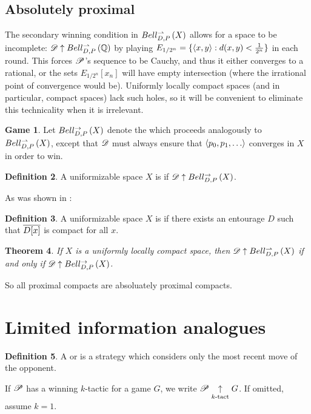 \documentclass{amsart}
\newtheorem{theorem}{Theorem}[section]
\theoremstyle{definition}
\newtheorem{definition}[theorem]{Definition}
\newtheorem{game}[theorem]{Game}
\begin{document}
\subsection{Absolutely proximal}

  The secondary winning condition in \(Bell_{D,P}^{\rightharpoonup}\left({X}\right)\)
  allows for a space to be incomplete: \(\mathscr{D}\uparrow Bell_{D,P}^{\rightharpoonup}\left({\mathbb{Q}}\right)\) by
  playing \(E_{1/2^n}=\{\langle x,y\rangle:d(x,y)<\frac{1}{2^n}\}\) in each round. This
  forces \(\mathscr{P}\)'s sequence to be Cauchy, and thus it either converges to
  a rational, or the sets \(E_{1/2^n}[x_n]\) will have empty intersection
  (where the irrational point of convergence would be). Uniformly locally
  compact spaces (and in particular, compact spaces) lack such holes, so it
  will be convenient to eliminate this technicality when it is irrelevant.

  \begin{game}
    Let \(Bell_{D,P}^{\to}\left({X}\right)\) denote the
     which
    proceeds analogously to \(Bell_{D,P}^{\rightharpoonup}\left({X}\right)\), except
    that \(\mathscr{D}\) must always ensure that \(\<p_0,p_1,\dots\>\) converges
    in \(X\) in order to win.
  \end{game}

  \begin{definition}
    A uniformizable space \(X\) is  if
    \(\mathscr{D} \uparrow Bell_{D,P}^{\to}\left({X}\right)\).
  \end{definition}

  As was shown in \cite{MR3227201}:

  \begin{definition}
    A uniformizable space \(X\) is  if there
    exists an entourage \(D\) such that \(\overline{D[x]}\) is compact
    for all \(x\).
  \end{definition}

  \begin{theorem}\label{uniformlyLocallyCompact}
    If \(X\) is a uniformly locally compact space, then
    \(\mathscr{D} \uparrow Bell_{D,P}^{\rightharpoonup}\left({X}\right)\) if and only if
    \(\mathscr{D} \uparrow Bell_{D,P}^{\to}\left({X}\right)\).
  \end{theorem}

  So all proximal compacts are absoluately proximal compacts.


\section{Limited information analogues}

  \begin{definition}
    A  or 
    is a strategy which considers only the most recent move of the opponent.

    If \(\mathscr{P}\) has a winning \(k\)-tactic for a game \(G\), we write
    \(\mathscr{P}\underset{k\text{-tact}}{\uparrow} G\). If omitted, assume \(k=1\).
  \end{definition}
\end{document}
